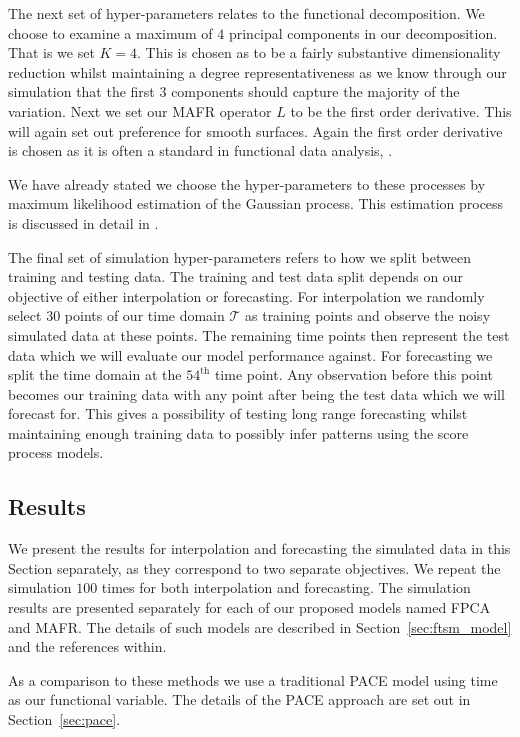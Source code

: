 The next set of hyper-parameters relates to the functional decomposition.
We choose to examine a maximum of $4$ principal components in our decomposition.
That is we set $K = 4$. 
This is chosen as to be a fairly substantive dimensionality reduction whilst maintaining a degree representativeness as we know through our simulation that the first $3$ components should capture the majority of the variation.
Next we set our MAFR operator $L$ to be the first order derivative.
This will again set out preference for smooth surfaces. 
Again the first order derivative is chosen as it is often a standard in functional data analysis, \citep{ramsay_functional_2010}. 

We have already stated we choose the hyper-parameters to these processes by maximum likelihood estimation of the Gaussian process.
This estimation process is discussed in detail in \citep{williams_gaussian_2006}.

The final set of simulation hyper-parameters refers to how we split between training and testing data.
The training and test data split depends on our objective of either interpolation or forecasting.
For interpolation we randomly select $30$ points of our time domain $\mathcal{T}$ as training points and observe the noisy simulated data at these points.
The remaining time points then represent the test data which we will evaluate our model performance against.
For forecasting we split the time domain at the $54^\text{th}$ time point.
Any observation before this point becomes our training data with any point after being the test data which we will forecast for. 
This gives a possibility of testing long range forecasting whilst maintaining enough training data to possibly infer patterns using the score process models.

\subsection{Results \label{ssec:ftsm_sim_res}}
We present the results for interpolation and forecasting the simulated data in this Section separately, as they correspond to two separate objectives.
We repeat the simulation $100$ times for both interpolation and forecasting.
The simulation results are presented separately for each of our proposed models named FPCA and MAFR.
The details of such models are described in Section~\ref{sec:ftsm_model} and the references within.

As a comparison to these methods we use a traditional PACE model using time as our functional variable.
The details of the PACE approach are set out in Section~\ref{sec:pace}.

